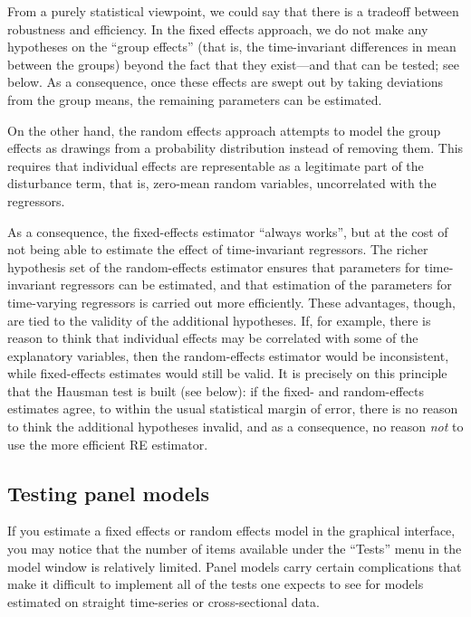 From a purely statistical viewpoint, we could say that there is a
tradeoff between robustness and efficiency. In the fixed effects
approach, we do not make any hypotheses on the ``group effects'' (that
is, the time-invariant differences in mean between the groups) beyond
the fact that they exist---and that can be tested; see below. As a
consequence, once these effects are swept out by taking deviations
from the group means, the remaining parameters can be estimated.

On the other hand, the random effects approach attempts to model the
group effects as drawings from a probability distribution instead of
removing them. This requires that individual effects are representable
as a legitimate part of the disturbance term, that is, zero-mean
random variables, uncorrelated with the regressors.

As a consequence, the fixed-effects estimator ``always works'', but at
the cost of not being able to estimate the effect of time-invariant
regressors.  The richer hypothesis set of the random-effects estimator
ensures that parameters for time-invariant regressors can be
estimated, and that estimation of the parameters for time-varying
regressors is carried out more efficiently.  These advantages, though,
are tied to the validity of the additional hypotheses. If, for
example, there is reason to think that individual effects may be
correlated with some of the explanatory variables, then the
random-effects estimator would be inconsistent, while fixed-effects
estimates would still be valid.  It is precisely on this principle
that the Hausman test is built (see below): if the fixed- and
random-effects estimates agree, to within the usual statistical margin
of error, there is no reason to think the additional hypotheses
invalid, and as a consequence, no reason \textit{not} to use the more
efficient RE estimator.

\subsection{Testing panel models}
\label{panel-tests}

If you estimate a fixed effects or random effects model in the
graphical interface, you may notice that the number of items available
under the ``Tests'' menu in the model window is relatively limited.
Panel models carry certain complications that make it difficult to
implement all of the tests one expects to see for models estimated on
straight time-series or cross-sectional data.  

